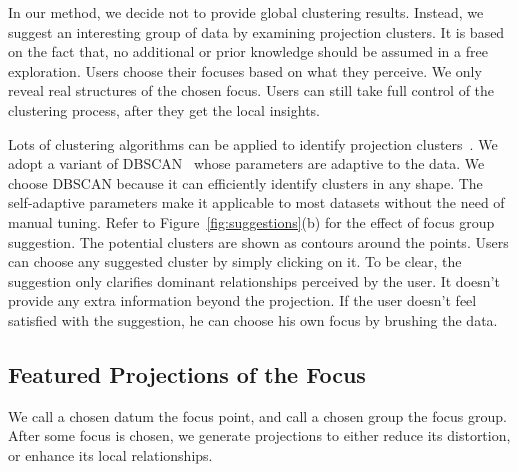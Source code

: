 In our method, we decide not to provide global clustering results. Instead, we suggest an interesting group of data by examining projection clusters. It is based on the fact that, no additional or prior knowledge should be assumed in a free exploration. Users choose their focuses based on what they perceive. We only reveal real structures of the chosen focus. Users can still take full control of the clustering process, after they get the local insights.

Lots of clustering algorithms can be applied to identify projection clusters~\cite{DBLP:conf/ieeevast/Kandogan12}. We adopt a variant of DBSCAN~\cite{zhou2012research} whose parameters are adaptive to the data. We choose DBSCAN because it can efficiently identify clusters in any shape. The self-adaptive parameters make it applicable to most datasets without the need of manual tuning. Refer to Figure~\ref{fig:suggestions}(b) for the effect of focus group suggestion. The potential clusters are shown as contours around the points. Users can choose any suggested cluster by simply clicking on it. To be clear, the suggestion only clarifies dominant relationships perceived by the user. It doesn't provide any extra information beyond the projection. If the user doesn't feel satisfied with the suggestion, he can choose his own focus by brushing the data.

\subsection{Featured Projections of the Focus}
We call a chosen datum the focus point, and call a chosen group the focus group. After some focus is chosen, we generate projections to either reduce its distortion, or enhance its local relationships.

